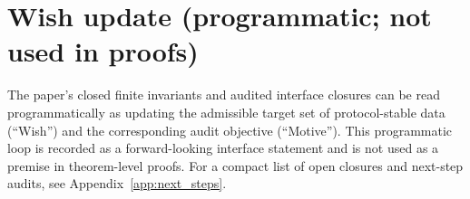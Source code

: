 \section*{Wish update (programmatic; not used in proofs)}
\label{subsec:wish_update_programmatic}
\AuditTag The paper's closed finite invariants and audited interface closures can be read programmatically as updating the admissible target set of protocol-stable data (``Wish'') and the corresponding audit objective (``Motive'').
This programmatic loop is recorded as a forward-looking interface statement and is not used as a premise in theorem-level proofs.
For a compact list of open closures and next-step audits, see Appendix~\ref{app:next_steps}.


